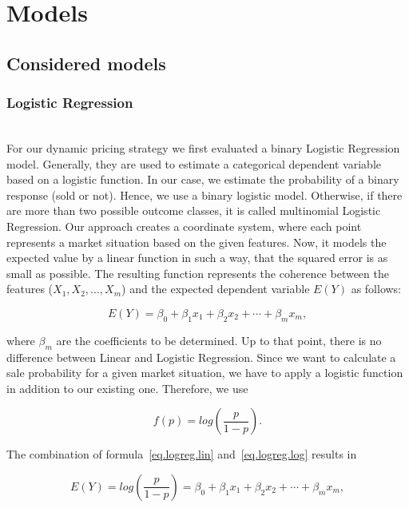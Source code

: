 \section{Models}
\label{sec:models}
\subsection{Considered models}
\subsubsection{Logistic Regression}
    ~\\
    For our dynamic pricing strategy we first evaluated a binary Logistic Regression model. Generally, they are used to estimate a categorical dependent variable based on a logistic function. In our case, we estimate the probability of a binary response (sold or not). Hence, we use a binary logistic model. Otherwise, if there are more than two possible outcome classes, it is called multinomial Logistic Regression.
    Our approach creates a coordinate system, where each point represents a market situation based on the given features. Now, it models the expected value by a linear function in such a way, that the squared error is as small as possible. The resulting function represents the coherence between the features ($X_1, X_2, ..., X_m$) and the expected dependent variable $E(Y)$ as follows:

    \begin{equation}
    \label{eq.logreg.lin}
    E(Y) = \beta _{0}+\beta _{1}x_{1}+\beta _{2}x_{2}+\cdots +\beta _{m}x_{m},
    \end{equation}

    where $\beta _m$ are the coefficients to be determined. Up to that point, there is no difference between Linear and Logistic Regression. Since we want to calculate a sale probability for a given market situation, we have to apply a logistic function in addition to our existing one. Therefore, we use

    \begin{equation}
    \label{eq.logreg.log}
    f(p)=log\left(\frac{p}{1-p}\right).
    \end{equation}

    The combination of formula~\ref{eq.logreg.lin} and~\ref{eq.logreg.log} results in

    \begin{equation}
    \label{eq.logreg.loglin}
    E(Y) = log\left(\frac{p}{1-p}\right) = \beta _{0}+\beta _{1}x_{1}+\beta _{2}x_{2}+\cdots +\beta _{m}x_{m},
    \end{equation}


